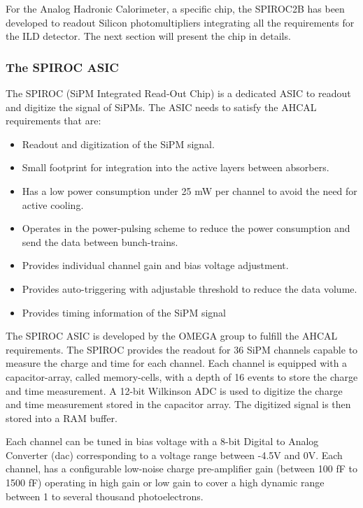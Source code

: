 For the Analog Hadronic Calorimeter, a specific chip, the SPIROC2B has been developed to readout Silicon photomultipliers integrating all the requirements for the ILD detector. The next section will present the chip in details.

\subsubsection{The SPIROC ASIC}
\label{sec:SPIROC2B}

The SPIROC (SiPM Integrated Read-Out Chip) \cite{5401891} is a dedicated ASIC to readout and digitize the signal of SiPMs. The ASIC needs to satisfy the AHCAL requirements that are:

\begin{itemize}
  \item Readout and digitization of the SiPM signal.
  \item Small footprint for integration into the active layers between absorbers.
  \item Has a low power consumption under 25 mW per channel to avoid the need for active cooling.
  \item Operates in the power-pulsing scheme to reduce the power consumption and send the data between bunch-trains.
  \item Provides individual channel gain and bias voltage adjustment.
  \item Provides auto-triggering with adjustable threshold to reduce the data volume.
  \item Provides timing information of the SiPM signal
\end{itemize}

The SPIROC ASIC is developed by the OMEGA group \cite{OmegaWeb} to fulfill the AHCAL requirements. The SPIROC provides the readout for 36 SiPM channels capable to measure the charge and time for each channel. Each channel is equipped with a capacitor-array, called memory-cells, with a depth of 16 events to store the charge and time measurement. A 12-bit Wilkinson ADC is used to digitize the charge and time measurement stored in the capacitor array. The digitized signal is then stored into a RAM buffer.

Each channel can be tuned in bias voltage with a 8-bit Digital to Analog Converter (\acrshort{dac}) corresponding to a voltage range between -4.5V and 0V. Each channel, has a configurable low-noise charge pre-amplifier gain (between 100 fF to 1500 fF) operating in high gain or low gain to cover a high dynamic range between 1 to several thousand photoelectrons.

